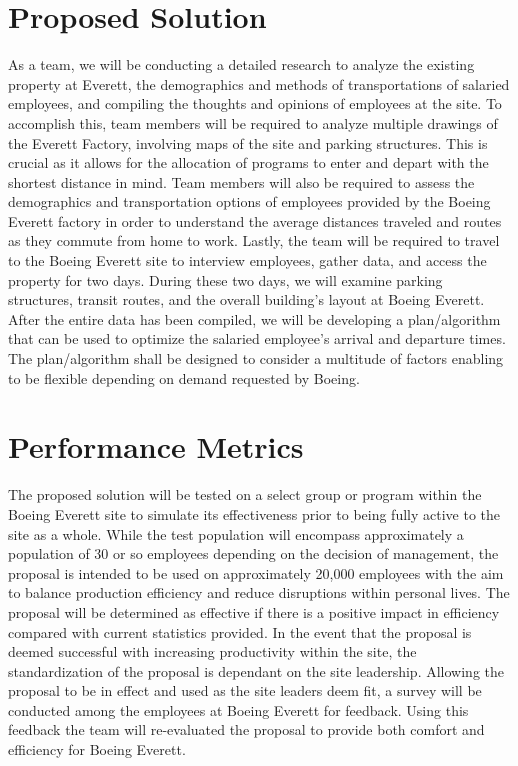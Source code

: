 \documentclass[journal, 11pt, letterpaper]{IEEEtran}
\newcommand\tab[1][1cm]{\hspace*{#1}}
\begin{document}
\section{Proposed Solution}

\tab As a team, we will be conducting a detailed research to analyze the existing property at Everett, the demographics and methods of transportations of salaried employees, and compiling the thoughts and opinions of employees at the site.
To accomplish this, team members will be required to analyze multiple drawings of the Everett Factory, involving maps of the site and parking structures. 
This is crucial as it allows for the allocation of programs to enter and depart with the shortest distance in mind.
Team members will also be required to assess the demographics and transportation options of employees provided by the Boeing Everett factory in order to understand the average distances traveled and routes as they commute from home to work.
Lastly, the team will be required to travel to the Boeing Everett site to interview employees, gather data, and access the property for two days. 
During these two days, we will examine parking structures, transit routes, and the overall building's layout at Boeing Everett. 
After the entire data has been compiled, we will be developing a plan/algorithm that can be used to optimize the salaried employee’s arrival and departure times.
The plan/algorithm shall be designed to consider a multitude of factors enabling to be flexible depending on demand requested by Boeing.


\section{Performance Metrics}
\tab The proposed solution will be tested on a select group or program within the Boeing Everett site to simulate its effectiveness prior to being fully active to the site as a whole. 
While the test population will encompass approximately a  population of 30 or so employees depending on the decision of management, the proposal is intended to be used on approximately 20,000 employees with the aim to balance production efficiency and reduce disruptions within personal lives. 
The proposal will be determined as effective if there is a positive impact in efficiency compared with current statistics provided. 
In the event that the proposal is deemed successful with increasing productivity within the site, the standardization of the proposal is dependant on the site leadership. 
Allowing the proposal to be in effect and used as the site leaders deem fit, a survey will be conducted among the employees at Boeing Everett for feedback. 
Using this feedback the team will re-evaluated the proposal to provide both comfort and efficiency for Boeing Everett.    
\end{document}
